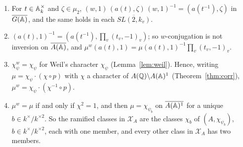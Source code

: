 \begin{lemma}\label{lem:w-action}
\begin{enumerate}[label=(\alph*)]
\item For $t\in\mathbb{A}_k^\times$ and $\zeta\in\mu_2$,
  $(w,1)\,(a(t),\zeta)\,(w,1)^{-1}=(a(t^{-1}),\zeta)$ in $\overline{G(\mathbb{A})}$, and the same
  holds in each $\overline{SL(2,k_v)}$.
\item $(a(t),1)^{-1}=(a(t^{-1}),\prod_v(t_v,-1)_v)$; so $w$-conjugation is
  not inversion on $\overline{A(\mathbb{A})}$, and
  $\mu^w(a(t),1)=\mu(a(t),1)^{-1}\prod_v(t_v,-1)_v$.
\item $\chi_\psi^w=\chi_\psi$ for Weil's character $\chi_\psi$
  (Lemma~\ref{lem:weil}). Hence, writing $\mu=\chi_\psi\cdot(\chi\circ p)$
  with $\chi$ a character of $A(\mathbb{Q})\backslash A(\mathbb{A})^1$
  (Theorem~\ref{thm:corr}), $\mu^w=\chi_\psi\cdot(\chi^{-1}\circ p)$.
\item $\mu^w=\mu$ if and only if $\chi^2=1$, and then
  $\mu=\chi_{\psi_b}$ on $\overline{A(\mathbb{A})^1}$ for a unique $b\in
  k^\times/k^{\times2}$. So the ramified classes in $\mathcal X_A$ are the
  classes $\chi_b$ of $(A,\chi_{\psi_b})$, $b\in k^\times/k^{\times2}$,
  each with one member, and every other class in $\mathcal X_A$ has two
  members.
\end{enumerate}
\end{lemma}

